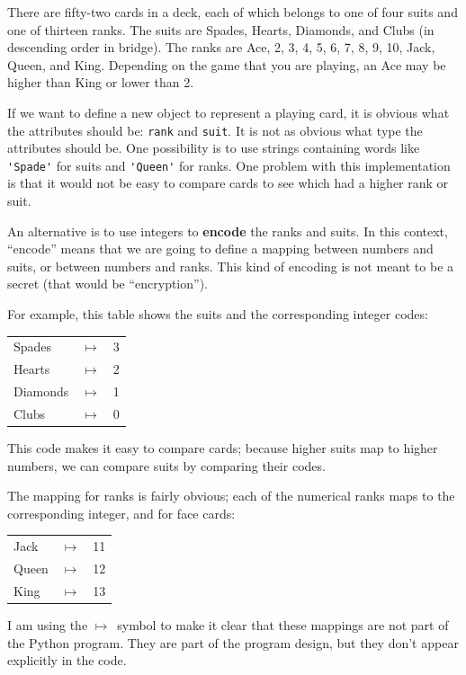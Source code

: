 \documentclass[10pt]{book}
\begin{document}
\begin{CJK}{UTF8}{gbsn}
There are fifty-two cards in a deck, each of which belongs to one of
four suits and one of thirteen ranks.  The suits are Spades, Hearts,
Diamonds, and Clubs (in descending order in bridge).  The ranks are
Ace, 2, 3, 4, 5, 6, 7, 8, 9, 10, Jack, Queen, and King.  Depending on
the game that you are playing, an Ace may be higher than King
or lower than 2.

If we want to define a new object to represent a playing card, it is
obvious what the attributes should be: {\tt rank} and
{\tt suit}.  It is not as obvious what type the attributes
should be.  One possibility is to use strings containing words like
\verb"'Spade'" for suits and \verb"'Queen'" for ranks.  One problem with
this implementation is that it would not be easy to compare cards to
see which had a higher rank or suit.

An alternative is to use integers to {\bf encode} the ranks and suits.
In this context, ``encode'' means that we are going to define a mapping
between numbers and suits, or between numbers and ranks.  This
kind of encoding is not meant to be a secret (that
would be ``encryption'').

\newcommand{\mymapsto}{$\mapsto$}

For example, this table shows the suits and the corresponding integer
codes:

\begin{tabular}{l c l}
Spades & \mymapsto & 3 \\
Hearts & \mymapsto & 2 \\
Diamonds & \mymapsto & 1 \\
Clubs & \mymapsto & 0
\end{tabular}

This code makes it easy to compare cards; because higher suits map to
higher numbers, we can compare suits by comparing their codes.

The mapping for ranks is fairly obvious; each of the numerical ranks
maps to the corresponding integer, and for face cards:

\begin{tabular}{l c l}
Jack & \mymapsto & 11 \\
Queen & \mymapsto & 12 \\
King & \mymapsto & 13 \\
\end{tabular}

I am using the \mymapsto~symbol to make it clear that these mappings
are not part of the Python program.  They are part of the program
design, but they don't appear explicitly in the code.


\end{CJK}
\end{document}
